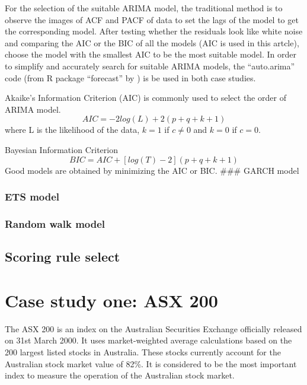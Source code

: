 \documentclass{monashthesis}
\theoremstyle{definition}
\theoremstyle{definition}
\theoremstyle{definition}
\theoremstyle{remark}
\begin{document}
For the selection of the suitable ARIMA model, the traditional method is
to observe the images of ACF and PACF of data to set the lags of the
model to get the corresponding model. After testing whether the
residuals look like white noise and comparing the AIC or the BIC of all
the models (AIC is used in this artcle), choose the model with the
smallest AIC to be the most suitable model. In order to simplify and
accurately search for suitable ARIMA models, the ``auto.arima'' code
(from R package ``forecast'' by \textcite{RH181}) is be used in both
case studies.

Akaike's Information Criterion (AIC) is commonly used to select the
order of ARIMA model. \[AIC=-2log(L)+2(p+q+k+1)\] where L is the
likelihood of the data, \(k=1\) if \(c\neq0\) and \(k=0\) if \(c=0\).

Bayesian Information Criterion \[BIC=AIC+[log(T)-2](p+q+k+1)\] Good
models are obtained by minimizing the AIC or BIC. \#\#\# GARCH model

\subsection{ETS model}\label{ets-model}

\subsection{Random walk model}\label{random-walk-model}

\section{Scoring rule select}\label{scoring-rule-select}

\subsection{}\label{section}

\chapter{Case study one: ASX 200}\label{case-study-one-asx-200}

The ASX 200 is an index on the Australian Securities Exchange officially
released on 31st March 2000. It uses market-weighted average
calculations based on the 200 largest listed stocks in Australia. These
stocks currently account for the Australian stock market value of 82\%.
It is considered to be the most important index to measure the operation
of the Australian stock market.
\end{document}
